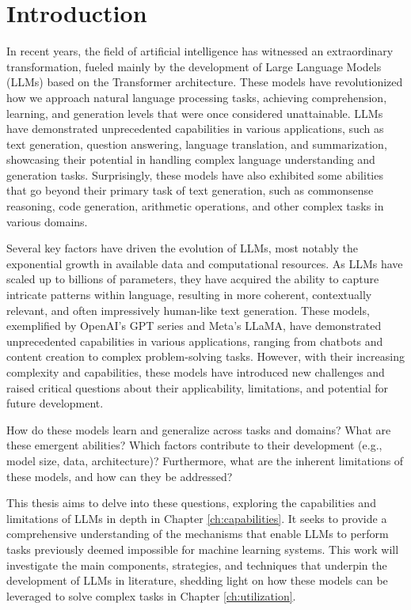 

\chapter*{Introduction}

In recent years, the field of artificial intelligence has witnessed an extraordinary transformation, fueled mainly by the development of Large Language Models (LLMs) based on the Transformer architecture.
These models have revolutionized how we approach natural language processing tasks, achieving comprehension, learning, and generation levels that were once considered unattainable.
LLMs have demonstrated unprecedented capabilities in various applications, such as text generation, question answering, language translation, and summarization, showcasing their potential in handling complex language understanding and generation tasks.
Surprisingly, these models have also exhibited some abilities that go beyond their primary task of text generation, such as commonsense reasoning, code generation, arithmetic operations, and other complex tasks in various domains.

Several key factors have driven the evolution of LLMs, most notably the exponential growth in available data and computational resources.
As LLMs have scaled up to billions of parameters, they have acquired the ability to capture intricate patterns within language, resulting in more coherent, contextually relevant, and often impressively human-like text generation.
These models, exemplified by OpenAI's GPT series and Meta's LLaMA, have demonstrated unprecedented capabilities in various applications, ranging from chatbots and content creation to complex problem-solving tasks.
However, with their increasing complexity and capabilities, these models have introduced new challenges and raised critical questions about their applicability, limitations, and potential for future development.

How do these models learn and generalize across tasks and domains?
What are these emergent abilities?
Which factors contribute to their development (e.g., model size, data, architecture)?
Furthermore, what are the inherent limitations of these models, and how can they be addressed?

This thesis aims to delve into these questions, exploring the capabilities and limitations of LLMs in depth in Chapter \ref{ch:capabilities}.
It seeks to provide a comprehensive understanding of the mechanisms that enable LLMs to perform tasks previously deemed impossible for machine learning systems.
This work will investigate the main components, strategies, and techniques that underpin the development of LLMs in literature, shedding light on how these models can be leveraged to solve complex tasks in Chapter \ref{ch:utilization}.

